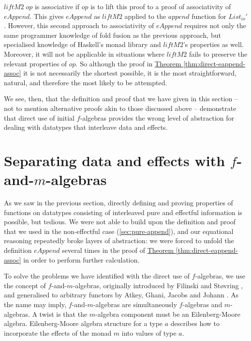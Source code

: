 \documentclass{jfp1}
\newcommand{\thmref}[1]{\hyperref[#1]{Theorem \ref*{#1}}}
\begin{document}
$\mathit{liftM2\; op}$ is associative if $\mathit{op}$ is to lift this
proof to a proof of associativity of $\mathit{eAppend}$. This gives
$\mathit{eAppend}$ as $\mathit{liftM2}$ applied to the
$\mathit{append}$ function for $\mathit{List_{io}'}$. However, this
second approach to associativity of $\mathit{eAppend}$ requires not
only the same programmer knowledge of fold fusion as the previous
approach, but specialised knowledge of Haskell's monad library and
$\mathit{liftM2}$'s properties as well. Moreover, it will not be
applicable in situations where $\mathit{liftM2}$ fails to preserve the
relevant properties of $\mathit{op}$. So although the proof in
\thmref{thm:direct-eappend-assoc} it is not necessarily the shortest
possible, it is the most straightforward, natural, and therefore the
most likely to be attempted.

We see, then, that the definition and proof that we have given in this
section -- not to mention alternative proofs akin to those discussed
above -- demonstrate that direct use of initial $f$-algebras provides
the wrong level of abstraction for dealing with datatypes that
interleave data and effects.

\section{Separating data and effects with \texorpdfstring{$f$}{f}-and-\texorpdfstring{$m$}{m}-algebras}
\label{sec:f-and-m-algebras}

As we saw in the previous section, directly defining and proving
properties of functions on datatypes consisting of interleaved pure
and effectful information is possible, but tedious. We were not able
to build upon the definition and proof that we used in the
non-effectful case (\autoref{sec:pure-append}), and our equational
reasoning repeatedly broke layers of abstraction: we were forced to
unfold the definition $\mathit{eAppend}$ several times in the proof of
\thmref{thm:direct-eappend-assoc} in order to perform further
calculation.

To solve the problems we have identified with the direct use of
$f$-algebras, we use the concept of $f$-and-$m$-algebras, originally
introduced by Filinski and St\o{}vring \cite{filinski07inductive}, and
generalised to arbitrary functors by Atkey, Ghani, Jacobs and Johann
\cite{atkey12fibrational}. As the name may imply, $f$-and-$m$-algebras
are simultaneously $f$-algebras and $m$-algebras. A twist is that the
$m$-algebra component must be an Eilenberg-Moore
algebra. Eilenberg-Moore algebra structure for a type $a$ describes
how to incorporate the effects of the monad $m$ into values of type
$a$.
\end{document}
